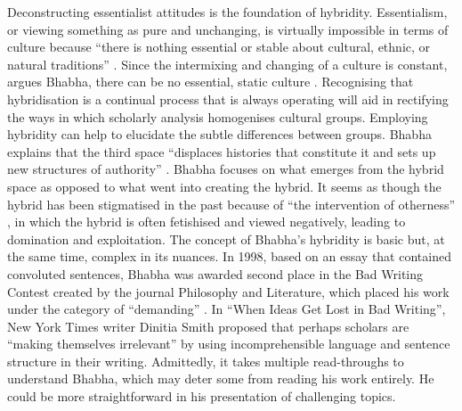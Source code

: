 	Deconstructing essentialist attitudes is the foundation of hybridity. Essentialism, or viewing something as pure and unchanging, is virtually impossible in terms of culture because “there is nothing essential or stable about cultural, ethnic, or natural traditions” \parencite [5] {VossAllen_2008}. Since the intermixing and changing of a culture is constant, argues Bhabha, there can be no essential, static culture \parencite[52] {Bhabha_1994}. Recognising that hybridisation is a continual process that is always operating will aid in rectifying the ways in which scholarly analysis homogenises cultural groups. Employing hybridity can help to elucidate the subtle differences between groups. Bhabha explains that the third space “displaces histories that constitute it and sets up new structures of authority” \parencite[211]{Rutherford_1990}. Bhabha focuses on what emerges from the hybrid space as opposed to what went into creating the hybrid. It seems as though the hybrid has been stigmatised in the past because of “the intervention of otherness” \parencite  [211] {Rutherford_1990}, in which the hybrid is often fetishised and viewed negatively, leading to domination and exploitation.
	The concept of Bhabha’s hybridity is basic but, at the same time, complex in its nuances. In 1998, based on an essay that contained convoluted sentences, Bhabha was awarded second place in the Bad Writing Contest created by the journal Philosophy and Literature, which placed his work under the category of “demanding” \parencite  {Smith_1999}. In “When Ideas Get Lost in Bad Writing”, New York Times writer Dinitia Smith proposed that perhaps scholars are “making themselves irrelevant” by using incomprehensible language and sentence structure in their writing.  Admittedly, it takes multiple read-throughs to understand Bhabha, which may deter some from reading his work entirely. He could be more straightforward in his presentation of challenging topics. 
	
